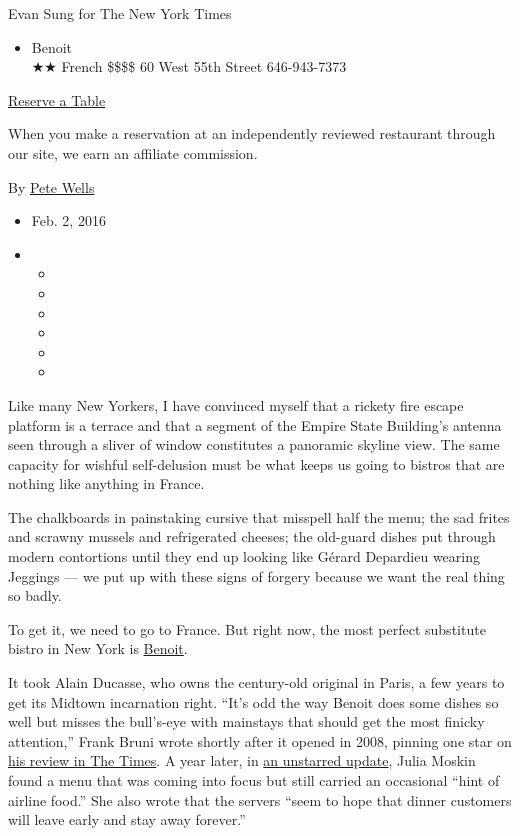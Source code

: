 Evan Sung for The New York Times

\begin{itemize}
\tightlist
\item
  Benoit\\
  ★★ French \$\$\$\$ 60 West 55th Street 646-943-7373
\end{itemize}

\href{http://www.opentable.com/single.aspx?ref=4201\&rid=21025}{Reserve
a Table}

When you make a reservation at an independently reviewed restaurant
through our site, we earn an affiliate commission.

By \href{http://www.nytimes3xbfgragh.onion/by/pete-wells}{Pete Wells}

\begin{itemize}
\item
  Feb. 2, 2016
\item
  \begin{itemize}
  \item
  \item
  \item
  \item
  \item
  \item
  \end{itemize}
\end{itemize}

Like many New Yorkers, I have convinced myself that a rickety fire
escape platform is a terrace and that a segment of the Empire State
Building's antenna seen through a sliver of window constitutes a
panoramic skyline view. The same capacity for wishful self-delusion must
be what keeps us going to bistros that are nothing like anything in
France.

The chalkboards in painstaking cursive that misspell half the menu; the
sad frites and scrawny mussels and refrigerated cheeses; the old-guard
dishes put through modern contortions until they end up looking like
Gérard Depardieu wearing Jeggings --- we put up with these signs of
forgery because we want the real thing so badly.

To get it, we need to go to France. But right now, the most perfect
substitute bistro in New York is
\href{http://www.benoitny.com/}{Benoit}.

It took Alain Ducasse, who owns the century-old original in Paris, a few
years to get its Midtown incarnation right. ``It's odd the way Benoit
does some dishes so well but misses the bull's-eye with mainstays that
should get the most finicky attention,'' Frank Bruni wrote shortly after
it opened in 2008, pinning one star on
\href{http://www.nytimes3xbfgragh.onion/2008/07/09/dining/reviews/09rest.html}{his
review in The Times}. A year later, in
\href{http://www.nytimes3xbfgragh.onion/2009/06/17/dining/reviews/17brief-002.html}{an
unstarred update}, Julia Moskin found a menu that was coming into focus
but still carried an occasional ``hint of airline food.'' She also wrote
that the servers ``seem to hope that dinner customers will leave early
and stay away forever.''

